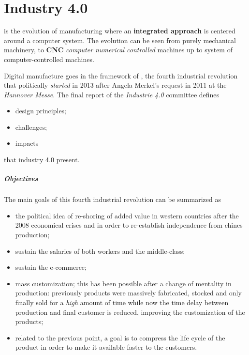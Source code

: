 \chapter{Industry 4.0}
	 is the evolution of manufacturing where an \textbf{integrated approach} is centered around a computer system. The evolution can be seen from purely mechanical machinery, to \textbf{CNC} \textit{computer numerical controlled} machines up to system of computer-controlled machines.	
	
	Digital manufacture goes in the framework of , the fourth industrial revolution that politically \textit{started} in 2013 after Angela Merkel's request in 2011 at the \textit{Hannover Messe}. The final report of the \textit{Industrie 4.0} committee defines
	\begin{itemize}
		\item design principles;
		\item challenges;
		\item impacts
	\end{itemize}
	that industry 4.0 present.
	
	\paragraph{Objectives} The main goals of this fourth industrial revolution can be summarized as
	\begin{itemize}
		\item the political idea of re-shoring of added value in western countries after the 2008 economical crises and in order to re-establish independence from chines production;
		\item sustain the salaries of both workers and the middle-class;
		\item sustain the e-commerce;
		\item mass customization; this has been possible after a change of mentality in production: previously products were massively fabricated, stocked and only finally sold for a \textit{high} amount of time while now the time delay between production and final customer is reduced, improving the customization of the products;
		\item related to the previous point, a goal is to compress the life cycle of the product in order to make it available faster to the customers.
		
	\end{itemize}
	
